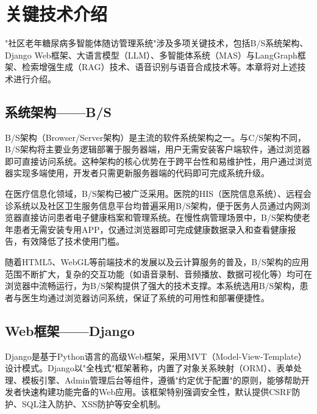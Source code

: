 \chapter{关键技术介绍}

"社区老年糖尿病多智能体随访管理系统"涉及多项关键技术，包括B/S系统架构、Django Web框架、大语言模型（LLM）、多智能体系统（MAS）与LangGraph框架、检索增强生成（RAG）技术、语音识别与语音合成技术等。本章将对上述技术进行介绍。

\section{系统架构——B/S}

B/S架构（Browser/Server架构）是主流的软件系统架构之一。与C/S架构不同，B/S架构将主要业务逻辑部署于服务器端，用户无需安装客户端软件，通过浏览器即可直接访问系统\todocite{}。这种架构的核心优势在于跨平台性和易维护性，用户通过浏览器实现多端使用，开发者只需更新服务器端的代码即可完成系统升级。

在医疗信息化领域，B/S架构已被广泛采用。医院的HIS（医院信息系统）、远程会诊系统以及社区卫生服务信息平台均普遍采用B/S架构，便于医务人员通过内网浏览器直接访问患者电子健康档案和管理系统\todocite{}。在慢性病管理场景中，B/S架构使老年患者无需安装专用APP，仅通过浏览器即可完成健康数据录入和查看健康报告，有效降低了技术使用门槛。

随着HTML5、WebGL等前端技术的发展以及云计算服务的普及，B/S架构的应用范围不断扩大，复杂的交互功能（如语音录制、音频播放、数据可视化等）均可在浏览器中流畅运行，为B/S架构提供了强大的技术支撑\todocite{}。本系统选用B/S架构，患者与医生均通过浏览器访问系统，保证了系统的可用性和部署便捷性。

\section{Web框架——Django}

Django是基于Python语言的高级Web框架，采用MVT（Model-View-Template）设计模式\todocite{}。Django以"全栈式"框架著称，内置了对象关系映射（ORM）、表单处理、模板引擎、Admin管理后台等组件，遵循"约定优于配置"的原则，能够帮助开发者快速构建功能完备的Web应用。该框架特别强调安全性，默认提供CSRF防护、SQL注入防护、XSS防护等安全机制。

